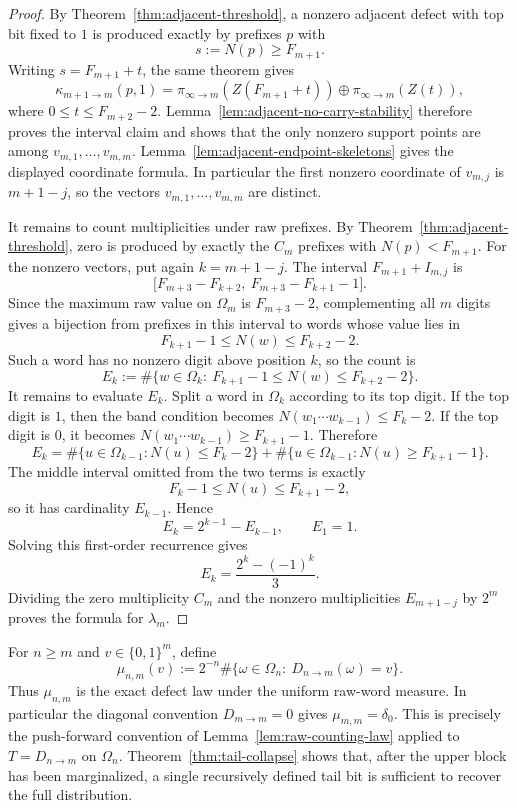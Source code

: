 \begin{proof}
By Theorem~\ref{thm:adjacent-threshold}, a nonzero adjacent defect with top
bit fixed to $1$ is produced exactly by prefixes $p$ with
\[
s:=N(p)\ge F_{m+1}.
\]
Writing $s=F_{m+1}+t$, the same theorem gives
\[
\kappa_{m+1\to m}(p,1)
=
\pi_{\infty\to m}(Z(F_{m+1}+t))
\oplus
\pi_{\infty\to m}(Z(t)),
\]
where $0\le t\le F_{m+2}-2$.  Lemma~\ref{lem:adjacent-no-carry-stability}
therefore proves the interval claim and shows that the only nonzero support
points are among $v_{m,1},\dots,v_{m,m}$.  Lemma~\ref{lem:adjacent-endpoint-skeletons}
gives the displayed coordinate formula.  In particular the first nonzero
coordinate of $v_{m,j}$ is $m+1-j$, so the vectors
$v_{m,1},\dots,v_{m,m}$ are distinct.

It remains to count multiplicities under raw prefixes.  By
Theorem~\ref{thm:adjacent-threshold}, zero is produced by exactly the $C_m$
prefixes with $N(p)<F_{m+1}$.  For the nonzero vectors, put again
$k=m+1-j$.  The interval $F_{m+1}+I_{m,j}$ is
\[
\bigl[F_{m+3}-F_{k+2},\ F_{m+3}-F_{k+1}-1\bigr].
\]
Since the maximum raw value on $\Omega_m$ is $F_{m+3}-2$, complementing all
$m$ digits gives a bijection from prefixes in this interval to words whose
value lies in
\[
F_{k+1}-1\le N(w)\le F_{k+2}-2.
\]
Such a word has no nonzero digit above position $k$, so the count is
\[
E_k:=\#\{w\in\Omega_k:\ F_{k+1}-1\le N(w)\le F_{k+2}-2\}.
\]
It remains to evaluate $E_k$.  Split a word in $\Omega_k$ according to its top
digit.  If the top digit is $1$, then the band condition becomes
$N(w_1\cdots w_{k-1})\le F_k-2$.  If the top digit is $0$, it becomes
$N(w_1\cdots w_{k-1})\ge F_{k+1}-1$.  Therefore
\[
E_k
=
\#\{u\in\Omega_{k-1}:N(u)\le F_k-2\}
+
\#\{u\in\Omega_{k-1}:N(u)\ge F_{k+1}-1\}.
\]
The middle interval omitted from the two terms is exactly
\[
F_k-1\le N(u)\le F_{k+1}-2,
\]
so it has cardinality $E_{k-1}$.  Hence
\[
E_k=2^{k-1}-E_{k-1},
\qquad
E_1=1.
\]
Solving this first-order recurrence gives
\[
E_k=\frac{2^k-(-1)^k}{3}.
\]
Dividing the zero multiplicity $C_m$ and the nonzero multiplicities
$E_{m+1-j}$ by $2^m$ proves the formula for $\lambda_m$.
\end{proof}

For $n\ge m$ and $v\in\{0,1\}^m$, define
\[
\mu_{n,m}(v):=2^{-n}\#\{\omega\in\Omega_n:\ D_{n\to m}(\omega)=v\}.
\]
Thus $\mu_{n,m}$ is the exact defect law under the uniform raw-word measure.
In particular the diagonal convention $D_{m\to m}=0$ gives
$\mu_{m,m}=\delta_0$.
This is precisely the push-forward convention of Lemma~\ref{lem:raw-counting-law}
applied to $T=D_{n\to m}$ on $\Omega_n$.
Theorem~\ref{thm:tail-collapse} shows that, after the upper block has been
marginalized, a single recursively defined tail bit is sufficient to recover
the full distribution.

